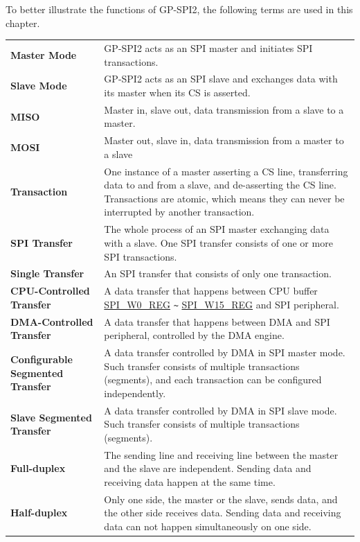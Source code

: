 To better illustrate the functions of GP-SPI2, the following terms are used in this chapter.

\begin{longtable}[c]{ R{7cm} p{10cm} }

\textbf{Master Mode}     & GP-SPI2 acts as an SPI master and initiates SPI transactions. \\
\textbf{Slave Mode}      & GP-SPI2 acts as an SPI slave and exchanges data with its master when its CS is asserted.\\
\textbf{MISO}       & Master in, slave out, data transmission from a slave to a master.\\
\textbf{MOSI}  & Master out, slave in, data transmission from a master to a slave \\
\textbf{Transaction} & One instance of a master asserting a CS line, transferring data to and from a slave, and de-asserting the CS line. Transactions are atomic, which means they can never be interrupted by another transaction.\\
\textbf{SPI Transfer} & The whole process of an SPI master exchanging data with a slave. One SPI transfer consists of one or more SPI transactions.\\
\textbf{Single Transfer} & An SPI transfer that consists of only one transaction. \\
\textbf{CPU-Controlled Transfer}& A data transfer that happens between CPU buffer \hyperref[regdesc:SPIW0REG]{SPI\_W0\_REG} \verb+~+ \hyperref[regdesc:SPIW15REG]{SPI\_W15\_REG} and SPI peripheral.\\
\textbf{DMA-Controlled Transfer}& A data transfer that happens between DMA and SPI peripheral, controlled by the DMA engine.\\
\textbf{Configurable Segmented Transfer}& A data transfer controlled by DMA in SPI master mode. Such transfer consists of multiple transactions (segments), and each transaction can be configured independently.\\
\textbf{Slave Segmented Transfer} & A data transfer controlled by DMA in SPI slave mode. Such transfer consists of multiple transactions (segments).\\
\textbf{Full-duplex} & The sending line and receiving line between the master and the slave are independent. Sending data and receiving data happen at the same time. \\
\textbf{Half-duplex} & Only one side, the master or the slave, sends data, and the other side receives data. Sending data and receiving data can not happen simultaneously on one side.\\

\end{longtable}
